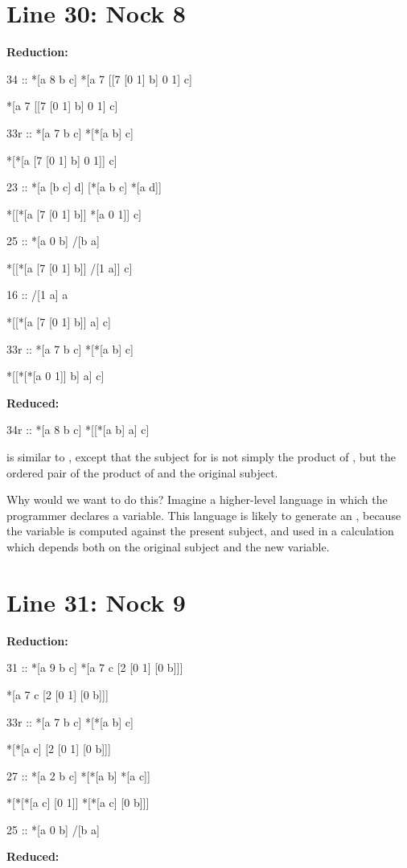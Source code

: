 \section{Line 30: Nock 8}

\textbf{ Reduction:}

\begin{code}
34 ::    *[a 8 b c]        *[a 7 [[7 [0 1] b] 0 1] c]

*[a 7 [[7 [0 1] b] 0 1] c]   

33r ::     *[a 7 b c]         *[*[a b] c]

*[*[a [7 [0 1] b] 0 1]] c]

23 ::    *[a [b c] d]      [*[a b c] *[a d]]

*[[*[a [7 [0 1] b]] *[a 0 1]] c]

25 ::    *[a 0 b]          /[b a]

*[[*[a [7 [0 1] b]] /[1 a]] c]

16 ::    /[1 a]            a

*[[*[a [7 [0 1] b]] a] c]

33r ::     *[a 7 b c]         *[*[a b] c]

*[[*[*[a 0 1]] b] a] c]
\end{code}
\textbf{ Reduced:}

\begin{code}
34r ::     *[a 8 b c]        *[[*[a b] a] c]
\end{code}
  is similar to , except that the subject for  is not simply the
 product of , but the ordered pair of the product of  and the original
 subject. 

Why would we want to do this?  Imagine a higher-level language in which the
programmer declares a variable.  This language is likely to generate an ,
because the variable is computed against the present subject, and used in a
calculation which depends both on the original subject and the new variable.

\section{Line 31: Nock 9}

\textbf{ Reduction:}

\begin{code}
31 :: *[a 9 b c]        *[a 7 c [2 [0 1] [0 b]]]

*[a 7 c [2 [0 1] [0 b]]]

33r ::     *[a 7 b c]         *[*[a b] c]

*[*[a c] [2 [0 1] [0 b]]]

27 ::     *[a 2 b c]        *[*[a b] *[a c]]

*[*[*[a c] [0 1]] *[*[a c] [0 b]]]

25 ::     *[a 0 b]          /[b a]
\end{code}
\textbf{ Reduced:}    


